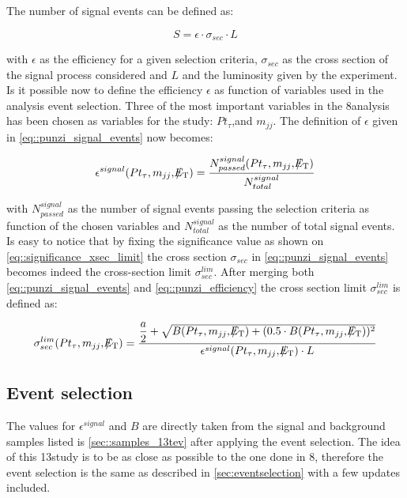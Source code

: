 The number of signal events can be defined as:

\begin{equation}
S = \epsilon \cdot \sigma_{sec} \cdot L
\label{eq::punzi_signal_events}
\end{equation}

with $\epsilon$ as the efficiency for a given selection criteria, $\sigma_{sec}$ as the cross section of the signal process considered and $L$ and the luminosity given by the experiment. Is it possible now to define the efficiency $\epsilon$ as function of variables used in the analysis event selection. Three of the most important variables in the 8\tev analysis has been chosen as variables for the study: $Pt_{\tau}$,\met and $m_{jj}$. The definition of $\epsilon$ given in \autoref{eq::punzi_signal_events} now becomes:

\begin{equation}
\epsilon^{signal} ( Pt_{\tau} , m_{jj} ,  \slash\mkern-12mu{E}_{\text{T}} ) = \dfrac{N^{signal}_{passed}(Pt_{\tau} , m_{jj} ,  \slash\mkern-12mu{E}_{\text{T}})}{N^{signal}_{total}}
\label{eq::punzi_efficiency}
\end{equation}

with $N^{signal}_{passed}$ as the number of signal events passing the selection criteria as function of the chosen variables and $N^{signal}_{total}$ as the number of total signal events. Is easy to notice that by fixing the significance value as shown on \autoref{eq::significance_xsec_limit} the cross section $\sigma_{sec}$ in \autoref{eq::punzi_signal_events} becomes indeed the cross-section limit $\sigma^{lim}_{sec}$. After merging both \autoref{eq::punzi_signal_events} and \autoref{eq::punzi_efficiency} the cross section limit $\sigma^{lim}_{sec}$ is defined as:
	
\begin{equation}
\sigma^{lim}_{sec}( Pt_{\tau} , m_{jj} ,  \met ) = \dfrac{\dfrac{a}{2} + \sqrt{B( Pt_{\tau} , m_{jj} ,  \met ) + (0.5 \cdot B( Pt_{\tau} , m_{jj} ,  \met ))^{2}}}{\epsilon^{signal} ( Pt_{\tau} , m_{jj} ,  \met ) \cdot L}
\label{eq::xsec_lim}
\end{equation}

\subsection{Event selection}
\label{subsec::event_sel_13tev}

The values for $\epsilon^{signal}$ and $B$ are directly taken from the signal and background samples listed is \autoref{sec::samples_13tev} after applying the event selection. The idea of this 13\tev study is to be as close as possible to the one done in 8\tev, therefore the event selection is the same as described in \autoref{sec:eventselection} with a few updates included.

